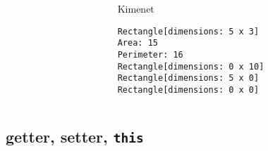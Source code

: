 \documentclass[usenames,dvipsnames,aspectratio=169]{beamer}
\begin{document}
\begin{frame}
    \begin{exampleblock}{}
        \scriptsize
        
    \end{exampleblock}
    \begin{exampleblock}{}
        \scriptsize
        
    \end{exampleblock}
\end{frame}

\begin{frame}[fragile]
    \begin{columns}
        \begin{column}{0.7\textwidth}
            \begin{exampleblock}{}
                \scriptsize
                
            \end{exampleblock}
        \end{column}
        \begin{column}{0.3\textwidth}
            \begin{block}{Kimenet}
                \vspace{-0.4cm}
                \scriptsize
                \begin{verbatim}
Rectangle[dimensions: 5 x 3]
Area: 15
Perimeter: 16
Rectangle[dimensions: 0 x 10]
Rectangle[dimensions: 5 x 0]
Rectangle[dimensions: 0 x 0]
\end{verbatim}
                \vspace{-0.4cm}
            \end{block}
        \end{column}
    \end{columns}
\end{frame}

\subsection{getter, setter, \texttt{this}}
\end{document}
